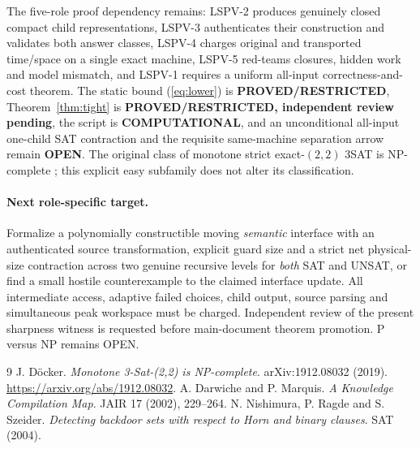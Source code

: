 \documentclass[11pt]{article}
\begin{document}
The five-role proof dependency remains: LSPV-2 produces genuinely closed compact child representations, LSPV-3 authenticates their construction and validates both answer classes, LSPV-4 charges original and transported time/space on a single exact machine, LSPV-5 red-teams closures, hidden work and model mismatch, and LSPV-1 requires a uniform all-input correctness-and-cost theorem. The static bound (\ref{eq:lower}) is \textbf{PROVED/RESTRICTED}, Theorem~\ref{thm:tight} is \textbf{PROVED/RESTRICTED, independent review pending}, the script is \textbf{COMPUTATIONAL}, and an unconditional all-input one-child SAT contraction and the requisite same-machine separation arrow remain \textbf{OPEN}. The original class of monotone strict exact-$(2,2)$ 3SAT is NP-complete \cite{docker}; this explicit easy subfamily does not alter its classification.

\paragraph{Next role-specific target.} Formalize a polynomially constructible moving \emph{semantic} interface with an authenticated source transformation, explicit guard size and a strict net physical-size contraction across two genuine recursive levels for \emph{both} SAT and UNSAT, or find a small hostile counterexample to the claimed interface update. All intermediate access, adaptive failed choices, child output, source parsing and simultaneous peak workspace must be charged. Independent review of the present sharpness witness is requested before main-document theorem promotion. P versus NP remains OPEN.

\begin{thebibliography}{9}
 J. D\"ocker. \emph{Monotone 3-Sat-(2,2) is NP-complete}. arXiv:1912.08032 (2019). \url{https://arxiv.org/abs/1912.08032}.
 A. Darwiche and P. Marquis. \emph{A Knowledge Compilation Map}. JAIR 17 (2002), 229--264.
 N. Nishimura, P. Ragde and S. Szeider. \emph{Detecting backdoor sets with respect to Horn and binary clauses}. SAT (2004).
\end{thebibliography}
\end{document}
